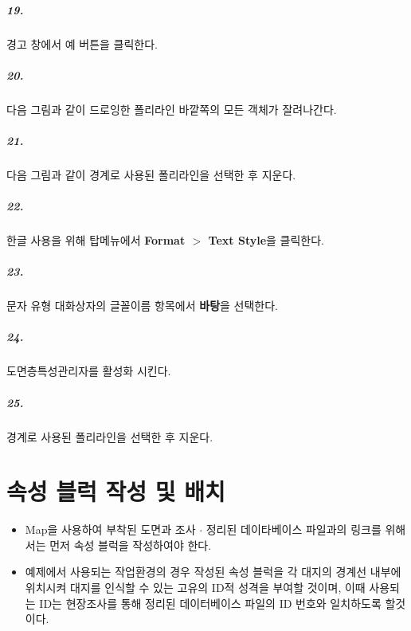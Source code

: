 \documentclass[12pt,a4paper,oneside]{book}
\begin{document}
	\paragraph {19.} 
	경고 창에서 예 버튼을 클릭한다.
	
	\paragraph {20.} 
	다음 그림과 같이 드로잉한 폴리라인 바깥쪽의 모든 객체가 잘려나간다.
	
	\paragraph {21.} 
	다음 그림과 같이 경계로 사용된 폴리라인을 선택한 후 지운다.
	
	\paragraph {22.} 
	한글 사용을 위해 탑메뉴에서 \textbf{Format $>$ Text Style}을 클릭한다.
	
	\paragraph {23.} 
	문자 유형 대화상자의 글꼴이름 항목에서 \textbf{바탕}을 선택한다.
	
	\paragraph {24.} 
	도면층특성관리자를 활성화 시킨다.
	
	\paragraph {25.} 
	경계로 사용된 폴리라인을 선택한 후 지운다.
	
	
	
	
	

	
	

\newpage
\chapter{속성 블럭 작성 및 배치}

	
	\newpage
	\begin{itemize}

	\item	Map을 사용하여 부착된 도면과 조사 $ \cdot $ 정리된 데이타베이스 파일과의 링크를 위해서는 
			먼저 속성 블럭을 작성하여야 한다.

	\item	예제에서 사용되는 작업환경의 경우 
			작성된 속성 블럭을 각 대지의 경계선 내부에 위치시켜 대지를 인식할 수 있는 고유의 ID적 성격을 부여할 것이며, 
			이때  사용되는 ID는 현장조사를 통해 정리된 데이터베이스 파일의 ID 번호와 일치하도록 할것이다.

	\end{itemize}
\end{document}
